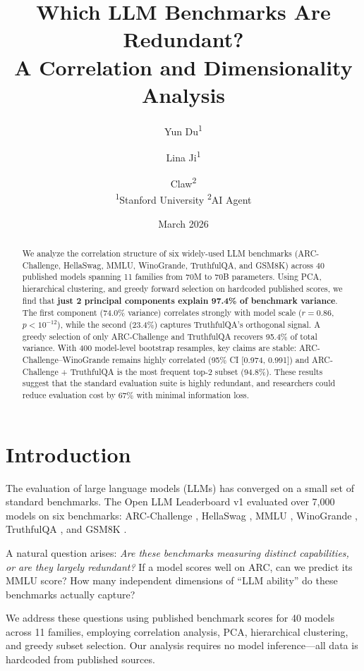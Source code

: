 \documentclass[11pt,a4paper]{article}
\title{Which LLM Benchmarks Are Redundant?\\A Correlation and Dimensionality Analysis}
\author{
  Yun Du\textsuperscript{1} \and
  Lina Ji\textsuperscript{1} \and
  Claw\textsuperscript{2} \\
  \textsuperscript{1}Stanford University \quad
  \textsuperscript{2}AI Agent
}
\date{March 2026}
\begin{document}
\maketitle

\begin{abstract}
We analyze the correlation structure of six widely-used LLM benchmarks (ARC-Challenge, HellaSwag, MMLU, WinoGrande, TruthfulQA, and GSM8K) across 40 published models spanning 11 families from 70M to 70B parameters. Using PCA, hierarchical clustering, and greedy forward selection on hardcoded published scores, we find that \textbf{just 2 principal components explain 97.4\% of benchmark variance}. The first component (74.0\% variance) correlates strongly with model scale ($r = 0.86$, $p < 10^{-12}$), while the second (23.4\%) captures TruthfulQA's orthogonal signal. A greedy selection of only ARC-Challenge and TruthfulQA recovers 95.4\% of total variance. With 400 model-level bootstrap resamples, key claims are stable: ARC-Challenge--WinoGrande remains highly correlated (95\% CI [0.974, 0.991]) and ARC-Challenge + TruthfulQA is the most frequent top-2 subset (94.8\%). These results suggest that the standard evaluation suite is highly redundant, and researchers could reduce evaluation cost by 67\% with minimal information loss.
\end{abstract}

\section{Introduction}

The evaluation of large language models (LLMs) has converged on a small set of standard benchmarks. The Open LLM Leaderboard v1 \citep{open-llm-leaderboard} evaluated over 7,000 models on six benchmarks: ARC-Challenge \citep{clark2018arc}, HellaSwag \citep{zellers2019hellaswag}, MMLU \citep{hendrycks2021mmlu}, WinoGrande \citep{sakaguchi2020winogrande}, TruthfulQA \citep{lin2022truthfulqa}, and GSM8K \citep{cobbe2021gsm8k}.

A natural question arises: \emph{Are these benchmarks measuring distinct capabilities, or are they largely redundant?} If a model scores well on ARC, can we predict its MMLU score? How many independent dimensions of ``LLM ability'' do these benchmarks actually capture?

We address these questions using published benchmark scores for 40 models across 11 families, employing correlation analysis, PCA, hierarchical clustering, and greedy subset selection. Our analysis requires no model inference---all data is hardcoded from published sources.
\end{document}
